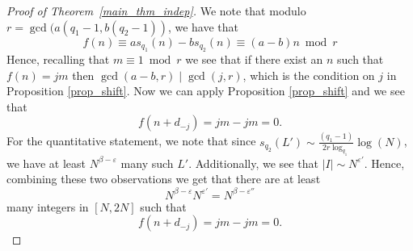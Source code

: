\documentclass[12pt]{amsart}
\theoremstyle{definition}
\numberwithin{equation}{section}
\numberwithin{equation}{section}
\begin{document}
\begin{proof}[Proof of Theorem~\ref{main_thm_indep}]
    We note that modulo $r=\gcd(a(q_1-1,b(q_2-1))$, we have that
    \[
        f(n) \equiv as_{q_1}(n)-bs_{q_2}(n) \equiv (a-b)n \bmod r 
    \]
    Hence, recalling that $m\equiv 1\bmod r$ we see that if there exist an $n$ such that $f(n)=jm$ then $\gcd(a-b,r)\mid \gcd(j,r)$, which is the condition on $j$ in Proposition \ref{prop_shift}. Now we can apply Proposition \ref{prop_shift} and we see that 
	\[
	   f(n+d_{-j})=jm-jm=0.
	\]
	For the quantitative statement, we note that since $s_{q_2}(L') \sim  \frac{(q_1-1)}{2r\log_{q_1}}\log(N)$, we have at least $N^{\beta-\varepsilon}$ many such $L'$. Additionally, we see that $|I|\sim N^{\varepsilon'}$. Hence, combining these two observations we get that there are at least
	\[
	   N^{\beta-\varepsilon}N^{\varepsilon'}=N^{\beta-\varepsilon''}
	\]
	many integers in $[N,2N]$ such that
	\[
	   f(n+d_{-j})=jm-jm=0.
	\]
\end{proof}
%
\end{document}
